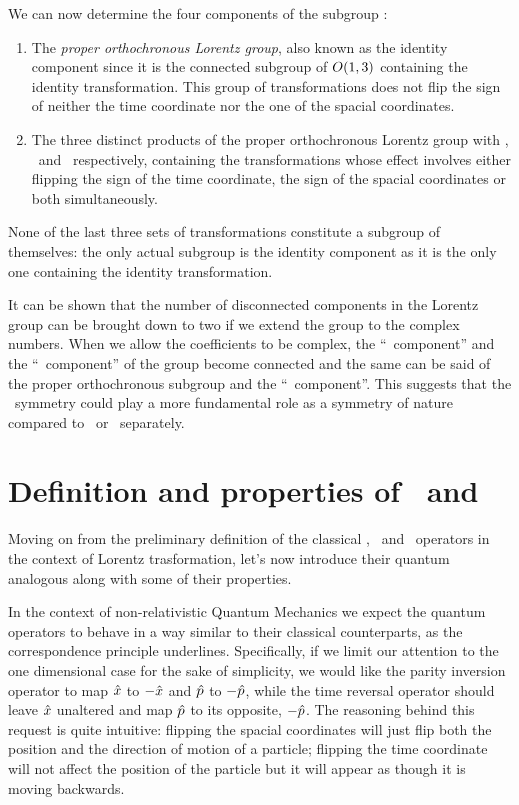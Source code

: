         We can now determine the four components of the subgroup \cite{bender2024}:
        \begin{enumerate}[label = \mybullet]
            \item The \emph{proper orthochronous Lorentz group}, also known as the identity component since it is the connected subgroup of $O\pqty{1,3}$ containing the identity transformation. This group of transformations does not flip the sign of neither the time coordinate nor the one of the spacial coordinates.
            \item The three distinct products of the proper orthochronous Lorentz group with \mcP, \mcT\ and \PT\ respectively, containing the transformations whose effect involves either flipping the sign of the time coordinate, the sign of the spacial coordinates or both simultaneously.
        \end{enumerate}
        None of the last three sets of transformations constitute a subgroup of themselves: the only actual subgroup is the identity component as it is the only one containing the identity transformation.
        
        It can be shown \cite{bender2024} that the number of disconnected components in the Lorentz group can be brought down to two if we extend the group to the complex numbers. When we allow the coefficients to be complex, the ``\mcP\ component'' and the ``\mcT\ component'' of the group become connected and the same can be said of the proper orthochronous subgroup and the ``\PT\ component''. This suggests that the \PT\ symmetry could play a more fundamental role as a symmetry of nature compared to \mcP\ or \mcT\ separately.
    
    \section{Definition and properties of \hP\ and \hT}
        Moving on from the preliminary definition of the classical \mcP, \mcT\ and \PT\ operators in the context of Lorentz trasformation, let's now introduce their quantum analogous along with some of their properties.

        In the context of non-relativistic Quantum Mechanics we expect the quantum operators to behave in a way similar to their classical counterparts, as the correspondence principle underlines. Specifically, if we limit our attention to the one dimensional case for the sake of simplicity, we would like the parity inversion operator to map $\hat{x}$ to $-\hat{x}$ and $\hat{p}$ to $-\hat{p}$, while the time reversal operator should leave $\hat{x}$ unaltered and map $\hat{p}$ to its opposite, $-\hat{p}$. The reasoning behind this request is quite intuitive: flipping the spacial coordinates will just flip both the position and the direction of motion of a particle; flipping the time coordinate will not affect the position of the particle but it will appear as though it is moving backwards.

